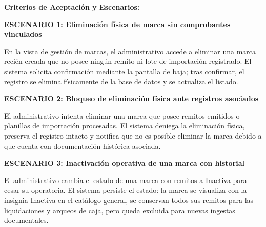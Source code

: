 \documentclass[a4paper,9pt]{article}
\begin{document}
\begin{tcolorbox}
\noindent\textbf{\footnotesize Criterios de Aceptación y Escenarios:}\par\vspace{2pt}
{\footnotesize
\noindent\textbf{\textcolor{secondarydark}{ESCENARIO 1:  Eliminación física de marca sin comprobantes vinculados}}\par\vspace{1pt}
En la vista de gestión de marcas, el administrativo accede a eliminar una marca recién creada que no posee ningún remito ni lote de importación registrado. El sistema solicita confirmación mediante la pantalla de baja; tras confirmar, el registro se elimina físicamente de la base de datos y se actualiza el listado.\par\vspace{2.5pt}
\noindent\textbf{\textcolor{secondarydark}{ESCENARIO 2:  Bloqueo de eliminación física ante registros asociados}}\par\vspace{1pt}
El administrativo intenta eliminar una marca que posee remitos emitidos o planillas de importación procesadas. El sistema deniega la eliminación física, preserva el registro intacto y notifica que no es posible eliminar la marca debido a que cuenta con documentación histórica asociada.\par\vspace{2.5pt}
\noindent\textbf{\textcolor{secondarydark}{ESCENARIO 3:  Inactivación operativa de una marca con historial}}\par\vspace{1pt}
El administrativo cambia el estado de una marca con remitos a Inactiva para cesar su operatoria. El sistema persiste el estado: la marca se visualiza con la insignia Inactiva en el catálogo general, se conservan todos sus remitos para las liquidaciones y arqueos de caja, pero queda excluida para nuevas ingestas documentales.\par\vspace{2.5pt}
}\par
\end{tcolorbox}
\end{document}
